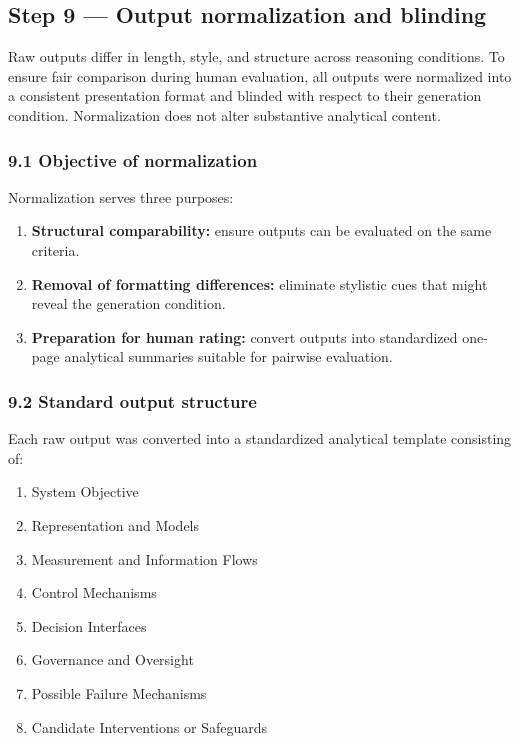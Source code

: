 {\subsection*{Step 9 --- Output normalization and blinding}
Raw outputs differ in length, style, and structure across reasoning conditions. To ensure fair comparison during human evaluation,
all outputs were normalized into a consistent presentation format and blinded with respect to their generation condition.
Normalization does not alter substantive analytical content.

\subsubsection*{9.1 Objective of normalization}
Normalization serves three purposes:
\begin{enumerate}
  \item \textbf{Structural comparability:} ensure outputs can be evaluated on the same criteria.
  \item \textbf{Removal of formatting differences:} eliminate stylistic cues that might reveal the generation condition.
  \item \textbf{Preparation for human rating:} convert outputs into standardized one-page analytical summaries suitable for pairwise evaluation.
\end{enumerate}

\subsubsection*{9.2 Standard output structure}
Each raw output was converted into a standardized analytical template consisting of:
\begin{enumerate}
  \item System Objective
  \item Representation and Models
  \item Measurement and Information Flows
  \item Control Mechanisms
  \item Decision Interfaces
  \item Governance and Oversight
  \item Possible Failure Mechanisms
  \item Candidate Interventions or Safeguards
\end{enumerate}

}
